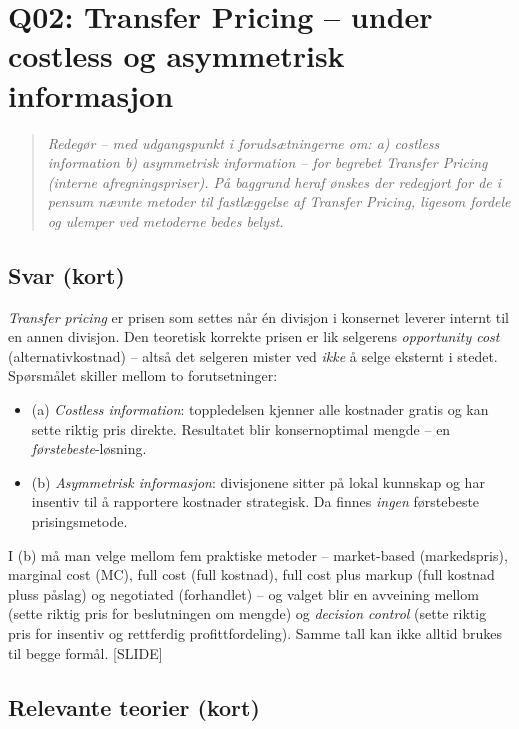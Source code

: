 \section{Q02: Transfer Pricing -- under costless og asymmetrisk informasjon}\label{q:02}

\begin{quote}
\emph{Redegør -- med udgangspunkt i forudsætningerne om: a) costless information b) asymmetrisk information -- for begrebet Transfer Pricing (interne afregningspriser). På baggrund heraf ønskes der redegjort for de i pensum nævnte metoder til fastlæggelse af Transfer Pricing, ligesom fordele og ulemper ved metoderne bedes belyst.}
\end{quote}

\subsection*{Svar (kort)}
\emph{Transfer pricing} er prisen som settes når én divisjon i konsernet leverer internt til en annen divisjon. Den teoretisk korrekte prisen er lik selgerens \emph{opportunity cost} (alternativkostnad) -- altså det selgeren mister ved \emph{ikke} å selge eksternt i stedet. Spørsmålet skiller mellom to forutsetninger:
\begin{itemize}\setlength{\itemsep}{2pt}
\item (a) \emph{Costless information}: toppledelsen kjenner alle kostnader gratis og kan sette riktig pris direkte. Resultatet blir konsernoptimal mengde -- en \emph{førstebeste}-løsning.
\item (b) \emph{Asymmetrisk informasjon}: divisjonene sitter på lokal kunnskap og har insentiv til å rapportere kostnader strategisk. Da finnes \emph{ingen} førstebeste prisingsmetode.
\end{itemize}
I (b) må man velge mellom fem praktiske metoder -- market-based (markedspris), marginal cost (MC), full cost (full kostnad), full cost plus markup (full kostnad pluss påslag) og negotiated (forhandlet) -- og valget blir en avveining mellom  (sette riktig pris for beslutningen om mengde) og \emph{decision control} (sette riktig pris for insentiv og rettferdig profittfordeling). Samme tall kan ikke alltid brukes til begge formål. [SLIDE]

\subsection*{Relevante teorier (kort)}

